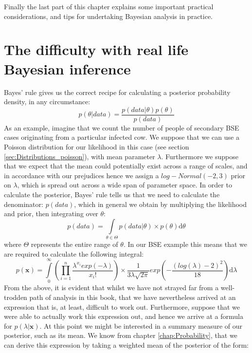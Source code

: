 \documentclass[11pt,fullpage]{book}
\begin{document}
Finally the last part of this chapter explains some important practical considerations, and tips for undertaking Bayesian analysis in practice.

\section{The difficulty with real life Bayesian inference}\label{sec:MCMC_difficultyBayesPosterior}
Bayes' rule gives us the correct recipe for calculating a posterior probability density, in any circumstance:
%
\begin{equation}
p(\theta|data) = \frac{p(data|\theta) p(\theta)}{p(data)}
\end{equation}
%
As an example, imagine that we count the number of people of secondary BSE cases originating from a particular infected cow. We suppose that we can use a Poisson distribution for our likelihood in this case (see section \ref{sec:Distributions_poisson}), with mean parameter $\lambda$. Furthermore we suppose that we expect that the mean could potentially exist across a range of scales, and in accordance with our prejudices hence we assign a $log-Normal(-2,3)$ prior on $\lambda$, which is spread out across a wide span of parameter space. In order to calculate the posterior, Bayes' rule tells us that we need to calculate the denominator: $p(data)$, which in general we obtain by multiplying the likelihood and prior, then integrating over $\theta$:
%
\begin{equation}
p(data) = \int\limits_{\theta\in\Theta} p(data|\theta) \times p(\theta) \mathrm{d}\theta
\end{equation}
%
where $\Theta$ represents the entire range of $\theta$. In our BSE example this means that we are required to calculate the following integral:
%
\begin{equation}\label{eq:MCMC_denominatorBSE}
p(\boldsymbol{x}) = \int\limits_{0}^{\infty}\left(\prod\limits_{i=1}^{n} \frac{\lambda^{x_i} exp(-\lambda)}{x_i!}\right) \times \frac{1}{3\lambda\sqrt{2\pi}} exp\left(-\frac{(log(\lambda)-2)^2}{18}\right)\mathrm{d}\lambda
\end{equation}
%
From the above, it is evident that whilst we have not strayed far from a well-trodden path of analysis in this book, that we have nevertheless arrived at an expression that is, at least, difficult to work out. Furthermore, suppose that we were able to actually work this expression out, and hence we arrive at a formula for $p(\lambda|\boldsymbol{x})$. At this point we might be interested in a summary measure of our posterior, such as its mean. We know from chapter \ref{chap:Probability}, that we can derive this expression by taking a weighted mean of the posterior of the form:
\end{document}
